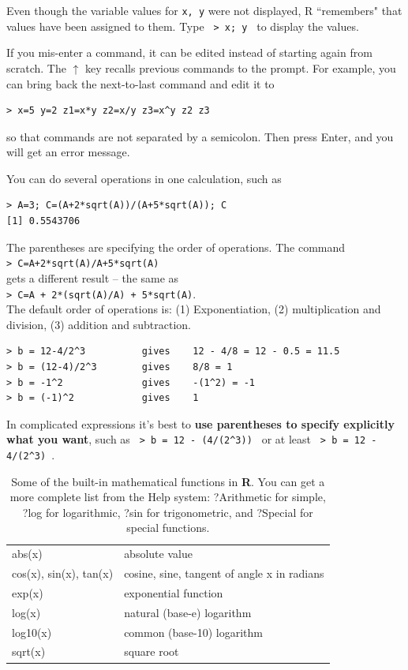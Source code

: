\documentclass [11pt]{article}
\newcommand{\blst}{\vspace{-0.035in} \begin{lstlisting}}
\numberwithin{exercise}{section}
\def\R{R }
\begin{document}
Even though the variable values for \texttt{x, y} were not displayed, \R ``remembers" that values have 
been assigned to them. Type \verb! > x; y ! to display the values. 

If you mis-enter a command, it can be edited instead of starting again from 
scratch. The \thinspace $\uparrow$ \thinspace key recalls previous 
commands to the prompt. For example, you can bring back the next-to-last command and edit it to
\blst
> x=5 y=2 z1=x*y z2=x/y z3=x^y z2 z3 
\end{lstlisting}
so that commands are not separated by a semicolon. Then press Enter, 
and you will get an error message. 

You can do several operations in one calculation, such as 
\blst
> A=3; C=(A+2*sqrt(A))/(A+5*sqrt(A)); C
[1] 0.5543706
\end{lstlisting}

The parentheses are specifying the order of operations. The command
\\
\hspace*{1in} \texttt{> C=A+2*sqrt(A)/A+5*sqrt(A)} \\
gets a different result -- the same as \\
\hspace*{1in} \texttt{> C=A + 2*(sqrt(A)/A) + 5*sqrt(A)}.
\\

The default order of operations is: (1) Exponentiation, (2) multiplication 
and division, (3) addition and subtraction. 
\blst
> b = 12-4/2^3          gives    12 - 4/8 = 12 - 0.5 = 11.5
> b = (12-4)/2^3        gives    8/8 = 1
> b = -1^2              gives    -(1^2) = -1
> b = (-1)^2            gives    1 
\end{lstlisting}
In complicated expressions it's best to \textbf{use parentheses to specify 
explicitly what you want}, such as \verb! > b = 12 - (4/(2^3)) ! 
or at least \verb! > b = 12 - 4/(2^3) !. 

\begin{table}[tb]
\caption{Some of the built-in mathematical functions in {\bf R}. You can
get a more complete list from the Help system: ?Arithmetic for simple, 
?log for logarithmic, ?sin for trigonometric, and ?Special for special functions.} 
\vspace{0.1in}
\begin{tabular}{p{140pt}p{290pt}}
\hline
abs(x) & absolute value \\
cos(x), sin(x), tan(x) &  cosine, sine, tangent of angle x in radians\\
exp(x)  & exponential function  \\
log(x)  & natural (base-e) logarithm \\
log10(x) &  common (base-10) logarithm \\
sqrt(x)  &  square root \\
\hline 
\end{tabular}
\label{MathFunctions}
\end{table}
\end{document}
